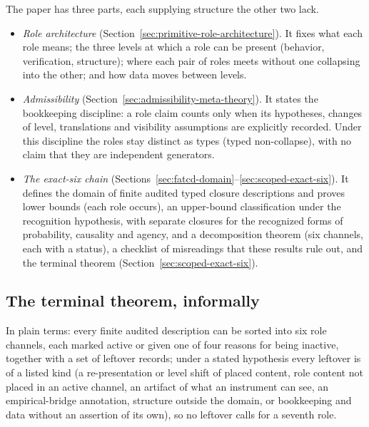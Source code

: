 The paper has three parts, each supplying structure the other two lack.
\begin{itemize}[topsep=2pt,itemsep=2pt]
  \item \emph{Role architecture}
    (Section~\ref{sec:primitive-role-architecture}). It fixes what each
    role means; the three levels at which a role can be present
    (behavior, verification, structure); where each pair of roles meets
    without one collapsing into the other; and how data moves between
    levels.
  \item \emph{Admissibility}
    (Section~\ref{sec:admissibility-meta-theory}). It states the
    bookkeeping discipline: a role claim counts only when its
    hypotheses, changes of level, translations and visibility
    assumptions are explicitly recorded. Under this discipline the roles
    stay distinct as types (typed non-collapse), with no claim that they
    are independent generators.
  \item \emph{The exact-six chain}
    (Sections~\ref{sec:fatcd-domain}--\ref{sec:scoped-exact-six}). It
    defines the domain \FATCD{} of finite audited typed closure
    descriptions and proves lower bounds (each role occurs), an
    upper-bound classification under the recognition hypothesis, with
    separate closures for the recognized forms of probability, causality
    and agency, and a decomposition theorem (six channels, each with a
    status), a checklist of misreadings that these results rule out, and
    the terminal theorem (Section~\ref{sec:scoped-exact-six}).
\end{itemize}

\subsection{The terminal theorem, informally}\label{subsec:terminal-informal}

In plain terms: every finite audited description can be sorted into six role
channels, each marked active or given one of four reasons for being inactive,
together with a set of leftover records; under a stated hypothesis every
leftover is of a listed kind (a re-presentation or level shift of placed
content, role content not placed in an active channel, an artifact of what an
instrument can see, an empirical-bridge annotation, structure outside the
domain, or bookkeeping and data without an assertion of its own), so no
leftover calls for a seventh role.

